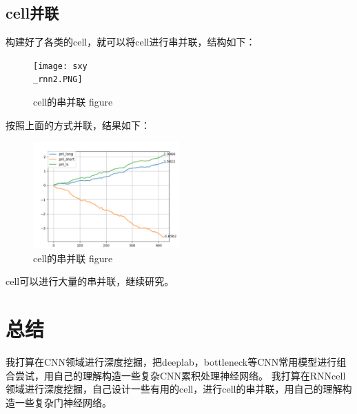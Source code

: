 \documentclass[11pt]{ctexart}
\begin{document}
\subsection{cell并联}
构建好了各类的cell，就可以将cell进行串并联，结构如下：
\begin{figure}[!ht]
\begin{center}
\texttt{[image: sxy\\\_rnn2.PNG]}
\end{center}
\caption{cell的串并联 figure}
\label{FIG.11}
\end{figure}
按照上面的方式并联，结果如下：
\begin{figure}[!ht]
\begin{center}
\includegraphics[width=0.5\textwidth]{wws.PNG}
\end{center}
\caption{cell的串并联 figure}
\label{FIG.12}
\end{figure}
cell可以进行大量的串并联，继续研究。


\section{总结}
我打算在CNN领域进行深度挖掘，把deeplab，bottleneck等CNN常用模型进行组合尝试，用自己的理解构造一些复杂CNN累积处理神经网络。
我打算在RNNcell领域进行深度挖掘，自己设计一些有用的cell，进行cell的串并联，用自己的理解构造一些复杂门神经网络。
\end{document}
